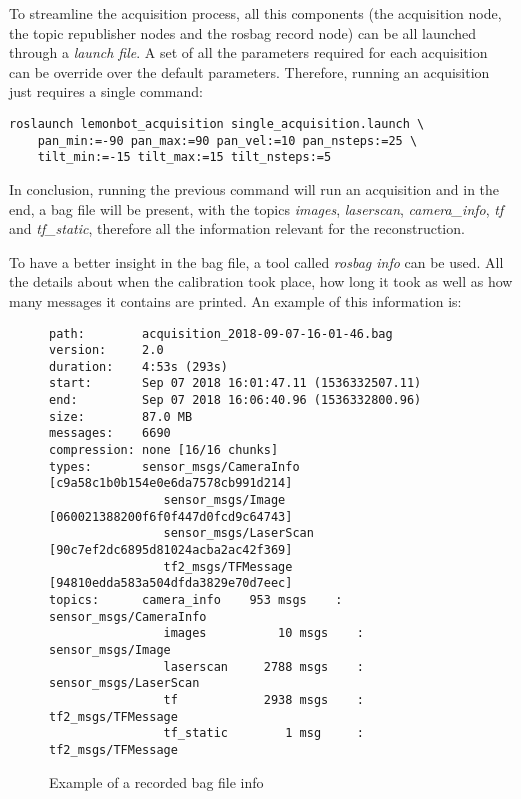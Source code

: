 To streamline the acquisition process, all this components (the acquisition node, the topic republisher nodes and the rosbag record node) can be all launched through a \emph{launch file}. A set of all the parameters required for each acquisition can be override over the default parameters. Therefore, running an acquisition just requires a single command:

\begin{verbatim}
roslaunch lemonbot_acquisition single_acquisition.launch \
    pan_min:=-90 pan_max:=90 pan_vel:=10 pan_nsteps:=25 \
    tilt_min:=-15 tilt_max:=15 tilt_nsteps:=5
\end{verbatim}

In conclusion, running the previous command will run an acquisition and in the end, a bag file will be present, with the topics \emph{images}, \emph{laserscan}, \emph{camera\_info}, \emph{tf} and \emph{tf\_static}, therefore all the information relevant for the reconstruction.

To have a better insight in the bag file, a tool called \emph{rosbag info} can be used. All the details about when the calibration took place, how long it took as well as how many messages it contains are printed. An example of this information is:

\begin{figure}
    
    \begin{Verbatim}[frame=single, fontsize=\small]
path:        acquisition_2018-09-07-16-01-46.bag
version:     2.0
duration:    4:53s (293s)
start:       Sep 07 2018 16:01:47.11 (1536332507.11)
end:         Sep 07 2018 16:06:40.96 (1536332800.96)
size:        87.0 MB
messages:    6690
compression: none [16/16 chunks]
types:       sensor_msgs/CameraInfo [c9a58c1b0b154e0e6da7578cb991d214]
                sensor_msgs/Image      [060021388200f6f0f447d0fcd9c64743]
                sensor_msgs/LaserScan  [90c7ef2dc6895d81024acba2ac42f369]
                tf2_msgs/TFMessage     [94810edda583a504dfda3829e70d7eec]
topics:      camera_info    953 msgs    : sensor_msgs/CameraInfo
                images          10 msgs    : sensor_msgs/Image     
                laserscan     2788 msgs    : sensor_msgs/LaserScan 
                tf            2938 msgs    : tf2_msgs/TFMessage    
                tf_static        1 msg     : tf2_msgs/TFMessage
    \end{Verbatim}

    \caption{Example of a recorded bag file info}
    \label{figure:bag-file-example}
\end{figure}


